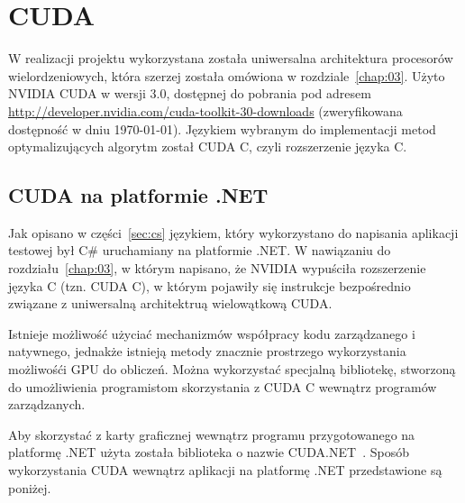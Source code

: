 \section{CUDA}
W realizacji projektu wykorzystana została uniwersalna architektura procesorów wielordzeniowych, która szerzej została omówiona w rozdziale~\ref{chap:03}. Użyto NVIDIA CUDA w wersji 3.0, dostępnej do pobrania pod adresem \url{http://developer.nvidia.com/cuda-toolkit-30-downloads} (zweryfikowana dostępność w dniu \today). Językiem wybranym do implementacji metod optymalizujących algorytm został CUDA C, czyli rozszerzenie języka C.

\subsection{CUDA na platformie .NET}
Jak opisano w części~\ref{sec:cs} językiem, który wykorzystano do napisania aplikacji testowej był C\# uruchamiany na platformie .NET. W nawiązaniu do rozdziału~\ref{chap:03}, w którym napisano, że NVIDIA wypuściła rozszerzenie języka C (tzn. CUDA C), w którym pojawiły się instrukcje bezpośrednio związane z uniwersalną architektruą wielowątkową CUDA.

Istnieje możliwość użyciać mechanizmów współpracy kodu zarządzanego i natywnego, jednakże istnieją metody znacznie prostrzego wykorzystania możliwośći GPU do obliczeń. Można wykorzystać specjalną bibliotekę, stworzoną do umożliwienia programistom skorzystania z CUDA C wewnątrz programów zarządzanych.

Aby skorzystać z karty graficznej wewnątrz programu przygotowanego na platformę .NET użyta została biblioteka o nazwie CUDA.NET~\cite{cuda:net}. Sposób wykorzystania CUDA wewnątrz aplikacji na platformę .NET przedstawione są poniżej.

